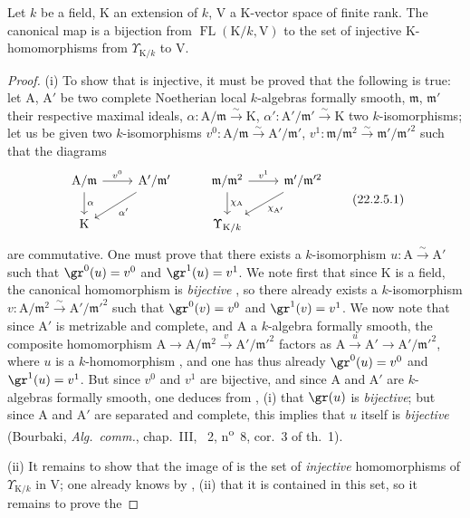 \begin{proposition}[22.2.5]
\label{0.22.2.5}
Let $k$ be a field, $\mathrm{K}$ an extension of $k$, $\mathrm{V}$ a $\mathrm{K}$-vector space of finite rank.
The canonical map  is a bijection from $\operatorname{FL}(\mathrm{K}/k,\mathrm{V})$ to the set of injective $\mathrm{K}$-homomorphisms from $\Upsilon_{\mathrm{K}/k}$ to $\mathrm{V}$.
\end{proposition}

\begin{proof}
(i) To show that  is injective, it must be proved that the following is true: let $\mathrm{A}$, $\mathrm{A}'$ be two complete Noetherian local $k$-algebras formally smooth, $\mathfrak{m}$, $\mathfrak{m}'$ their respective maximal ideals, $\alpha:\mathrm{A}/\mathfrak{m}\xrightarrow{\sim}\mathrm{K}$, $\alpha':\mathrm{A}'/\mathfrak{m}'\xrightarrow{\sim}\mathrm{K}$ two $k$-isomorphisms; let us be given two $k$-isomorphisms $v^0:\mathrm{A}/\mathfrak{m}\xrightarrow{\sim}\mathrm{A}'/\mathfrak{m}'$, $v^1:\mathfrak{m}/\mathfrak{m}^2\xrightarrow{\sim}\mathfrak{m}'/\mathfrak{m}'^2$ such that the diagrams
\[
\label{0.22.2.5.1}
  \begin{tikzcd}
    \mathrm{A}/\mathfrak{m} \ar[r,"v^0"] \ar[d,"\alpha"] & \mathrm{A}'/\mathfrak{m}' \ar[dl,"\alpha'"] & \mathfrak{m}/\mathfrak{m}^2 \ar[r,"v^1"] \ar[d,"\chi_\mathrm{A}"] & \mathfrak{m}'/\mathfrak{m}'^2 \ar[dl,"\chi_{\mathrm{A}'}"]\\
    \mathrm{K} & & \Upsilon_{\mathrm{K}/k} &
  \end{tikzcd}
  \tag{22.2.5.1}
\]
are commutative.
One must prove that there exists a $k$-isomorphism $u:\mathrm{A}\xrightarrow{\sim}\mathrm{A}'$ such that $\gr^0(u)=v^0$ and $\gr^1(u)=v^1$.
We note first that since $\mathrm{K}$ is a field, the canonical homomorphism  is \emph{bijective} , so there already exists a $k$-isomorphism $v:\mathrm{A}/\mathfrak{m}^2\xrightarrow{\sim}\mathrm{A}'/\mathfrak{m}'^2$ such that $\gr^0(v)=v^0$ and $\gr^1(v)=v^1$.
We now note that since $\mathrm{A}'$ is metrizable and complete, and $\mathrm{A}$ a $k$-algebra formally smooth, the composite homomorphism $\mathrm{A}\to\mathrm{A}/\mathfrak{m}^2\xrightarrow{v}\mathrm{A}'/\mathfrak{m}'^2$ factors as $\mathrm{A}\xrightarrow{u}\mathrm{A}'\to\mathrm{A}'/\mathfrak{m}'^2$, where $u$ is a $k$-homomorphism , and one has thus already $\gr^0(u)=v^0$ and $\gr^1(u)=v^1$.
But since $v^0$ and $v^1$ are bijective, and since $\mathrm{A}$ and $\mathrm{A}'$ are $k$-algebras formally smooth, one deduces from , (i) that $\gr(u)$ is \emph{bijective}; but since $\mathrm{A}$ and $\mathrm{A}'$ are separated and complete, this implies that $u$ itself is \emph{bijective} (Bourbaki, \emph{Alg.~comm.}, chap.~III, \textsection~2, n\textsuperscript{o}~8, cor.~3 of th.~1).

(ii) It remains to show that the image of  is the set of \emph{injective} homomorphisms of $\Upsilon_{\mathrm{K}/k}$ in $\mathrm{V}$; one already knows by , (ii) that it is contained in this set, so it remains to prove the
\end{proof}

